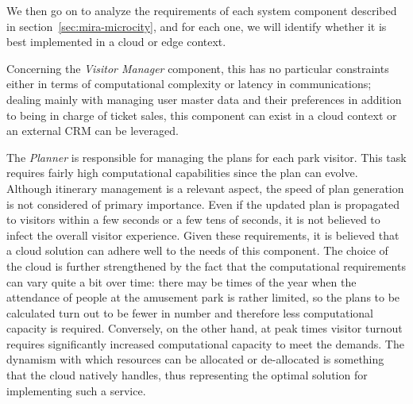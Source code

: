 We then go on to analyze the requirements of each system component described in section~\ref{sec:mira-microcity}, and for each one, we will identify
whether it is best implemented in a cloud or edge context.


Concerning the \textit{Visitor Manager} component, this has no particular constraints either in terms of computational complexity or latency in
communications; dealing mainly with managing user master data and their preferences in addition to being in charge of ticket sales, this component
can exist in a cloud context or an external CRM can be leveraged.

The \textit{Planner} is responsible for managing the plans for each park visitor. This task requires fairly high computational capabilities since the
plan can evolve. Although itinerary management is a relevant aspect, the speed of plan generation is not considered of primary importance. Even if
the updated plan is propagated to visitors within a few seconds or a few tens of seconds, it is not believed to infect the overall visitor
experience. Given these requirements, it is believed that a cloud solution can adhere well to the needs of this component. The choice of the cloud is
further strengthened by the fact that the computational requirements can vary quite a bit over time: there may be times of the year when the
attendance of people at the amusement park is rather limited, so the plans to be calculated turn out to be fewer in number and therefore less
computational capacity is required. Conversely, on the other hand, at peak times visitor turnout requires significantly increased computational
capacity to meet the demands. The dynamism with which resources can be allocated or de-allocated is something that the cloud natively handles, thus
representing the optimal solution for implementing such a service.


